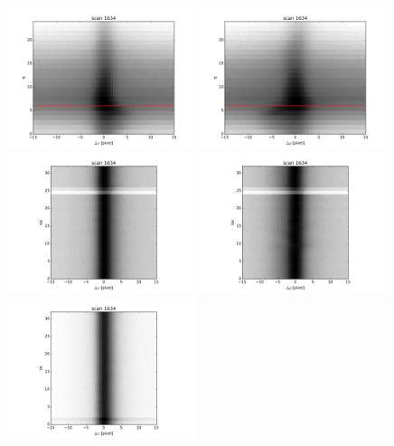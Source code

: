 \documentclass[12pt, preprint]{aastex}
\begin{document}
\begin{figure}[p]
\begin{center}
\includegraphics[width=0.49\textwidth]{figures/q-x_tot}
\includegraphics[width=0.49\textwidth]{figures/q-y_tot}
\includegraphics[width=0.49\textwidth]{figures/xa-x_tot}
\includegraphics[width=0.49\textwidth]{figures/xa-y_tot}
\includegraphics[width=0.49\textwidth]{figures/ya-x_tot}

\end{center}
\end{figure}
\end{document}
